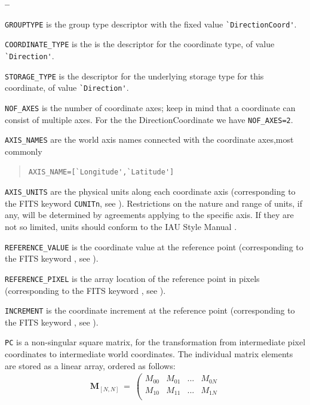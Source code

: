 \documentclass[a4paper,10pt,bibtotoc]{scrreprt}
\begin{document}
\begin{list}{\textbf{--}}{}
\item \verb|GROUPTYPE| is the group type descriptor with the fixed value
  \verb|`DirectionCoord'|.
\item \verb|COORDINATE_TYPE| is the is the descriptor for the
  coordinate type, of value \verb|`Direction'|.
\item \verb|STORAGE_TYPE| is the descriptor for the underlying storage
  type for this coordinate, of value \verb|`Direction'|.
\item \verb|NOF_AXES| is the number of coordinate axes; keep in mind
  that a coordinate can consist of multiple axes. For the the
  DirectionCoordinate we have \verb|NOF_AXES=2|.
\item \verb|AXIS_NAMES| are the world axis names connected with the
  coordinate axes,most commonly
  \begin{verse}
    \verb|AXIS_NAME=[`Longitude',`Latitude']|
  \end{verse}
\item \verb|AXIS_UNITS| are the physical units along each coordinate axis
  (corresponding to the FITS keyword \verb|CUNITn|, see \cite{fits.paper1}).
  Restrictions on the nature and range of units, if any, will be determined by
  agreements applying to the specific axis. If they are not so limited, units
  should conform to the IAU Style Manual \cite{mcnally.1988}.
\item \verb|REFERENCE_VALUE| is the coordinate value at the reference point
   (corresponding to the FITS keyword , see \cite{fits.paper1}).
\item \verb|REFERENCE_PIXEL| is the array location of the reference point in 
  pixels (corresponding to the FITS keyword , see \cite{fits.paper1}).
\item \verb|INCREMENT| is the coordinate increment at the reference point
   (corresponding to the FITS keyword , see \cite{fits.paper1}).
\item \verb|PC| is a non-singular square matrix, for the
  transformation from intermediate pixel coordinates to intermediate
  world coordinates. The individual matrix elements are stored as a
  linear array, ordered as follows:
  \begin{eqnarray*}
     \mathbf{M}_{[N,N]} \ = \ \left(
       \begin{array}{cccc}
         M_{00}  & M_{01} & ... & M_{0N} \\
         M_{10}  & M_{11} & ... & M_{1N} \\

\end{array}
\end{eqnarray*}
\end{list}
\end{document}
